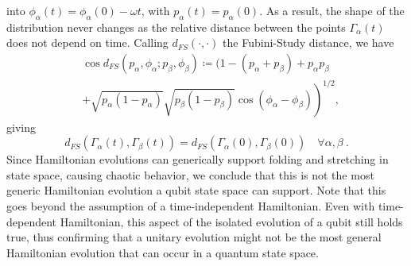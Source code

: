 \documentclass[draft,nofootinbib,pre,twocolumn,showpacs,showkeys,preprintnumbers,floatfix]{revtex4-1}
\newcommand{\1}{\mathbbm{1}}
\begin{document}
into $\phi_\alpha(t) = \phi_\alpha(0)- \omega t$, with $p_\alpha(t)=p_\alpha(0)$.
As a result, the shape of the distribution never changes as the relative distance
between the points $\Gamma_\alpha(t)$ does not depend on time. Calling $d_{FS}(\cdot,\cdot)$
the Fubini-Study distance, we have
\begin{align}
&\cos d_{FS}(p_\alpha, \phi_\alpha;p_\beta,\phi_\beta) \coloneqq \Big(1-(p_\alpha+p_\beta)+p_\alpha p_\beta \nonumber \\
&\left. +\sqrt{p_\alpha(1-p_\alpha)}\sqrt{p_\beta(1-p_\beta)}\cos (\phi_\alpha-\phi_\beta)\right)^{1/2},
\end{align}
giving
\begin{equation}
d_{FS}(\Gamma_\alpha(t),\Gamma_\beta(t))=d_{FS}(\Gamma_\alpha(0),\Gamma_\beta(0)) \quad \forall \alpha,\beta~.\label{eq:nochaos}
\end{equation}
Since Hamiltonian evolutions can generically support folding and stretching 
in state space, causing chaotic behavior, we conclude that this is not the 
most generic Hamiltonian evolution a qubit state space can support. Note
that this goes beyond the assumption of a time-independent Hamiltonian.
Even with time-dependent Hamiltonian, this aspect of the isolated evolution
of a qubit still holds true, thus confirming that a unitary evolution might not be
the most general Hamiltonian evolution that can occur in a quantum state space.




%
\end{document}
